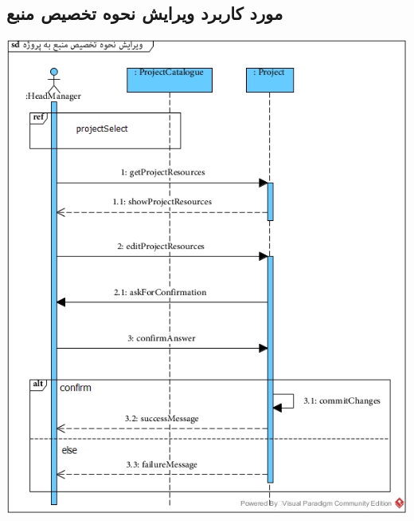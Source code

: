 \newpage
\vspace{2cm}
\subsection*{مورد کاربرد ویرایش نحوه تخصیص منبع}
\vspace{2cm}
\begin{center}
\includegraphics[width=\textwidth]{SequenceDiagrams/37.jpg}
\end{center}

